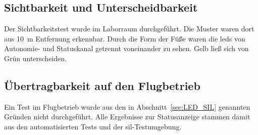         \subsection{Sichtbarkeit und Unterscheidbarkeit}
        \label{sec:Erg_LED_Sicht}
        

        Der Sichtbarkeitstest wurde im Laborraum durchgeführt. Die Muster waren dort aus \SI{10}{\metre} Entfernung erkennbar. Durch die Form der Füße waren die \glspl{led} von Autonomie- und Statuskanal getrennt voneinander zu sehen. Gelb ließ sich von Grün unterscheiden.

        \subsection{Übertragbarkeit auf den Flugbetrieb}
        \label{sec:Erg_LED_Flug}

        Ein Test im Flugbetrieb wurde aus den in Abschnitt~\ref{sec:LED_SIL} genannten Gründen nicht durchgeführt. Alle Ergebnisse zur Statusanzeige stammen damit aus den automatisierten Tests und der \gls{sil}-Testumgebung.
